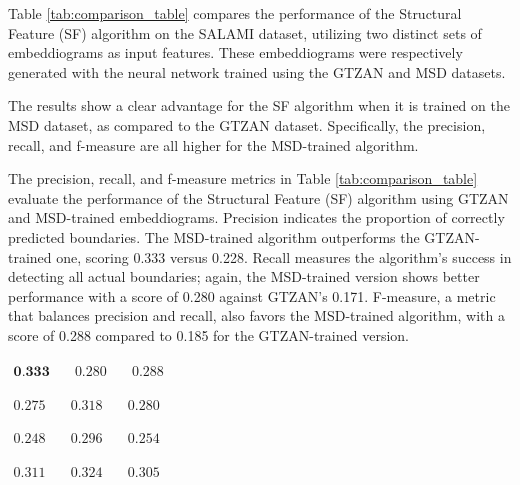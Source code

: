 
Table \ref{tab:comparison_table} compares the performance of the Structural Feature (SF) algorithm on the SALAMI dataset, utilizing two distinct sets of embeddiograms as input features. These embeddiograms were respectively generated with the neural network trained using the GTZAN and MSD datasets.

The results show a clear advantage for the SF algorithm when it is trained on the MSD dataset, as compared to the GTZAN dataset. Specifically, the precision, recall, and f-measure are all higher for the MSD-trained algorithm.

The precision, recall, and f-measure metrics in Table \ref{tab:comparison_table} evaluate the performance of the Structural Feature (SF) algorithm using GTZAN and MSD-trained embeddiograms. Precision indicates the proportion of correctly predicted boundaries. The MSD-trained algorithm outperforms the GTZAN-trained one, scoring 0.333 versus 0.228. Recall measures the algorithm's success in detecting all actual boundaries; again, the MSD-trained version shows better performance with a score of 0.280 against GTZAN's 0.171. F-measure, a metric that balances precision and recall, also favors the MSD-trained algorithm, with a score of 0.288 compared to 0.185 for the GTZAN-trained version.


\newsavebox\embeddiobSF
\begin{lrbox}{\embeddiobSF}
   $\begin{aligned}
     \textbf{0.333} & \quad 0.280 & \quad 0.288
    \end{aligned} $
\end{lrbox}

\newsavebox\embeddiobFoote
\begin{lrbox}{\embeddiobFoote}
   $\begin{aligned}
     0.275 & \quad 0.318 & \quad 0.280
    \end{aligned} $
\end{lrbox}

\newsavebox\embeddiobCNMF
\begin{lrbox}{\embeddiobCNMF}
   $\begin{aligned}
     0.248 & \quad 0.296 & \quad 0.254
    \end{aligned} $
\end{lrbox}

\newsavebox\pcpSF
\begin{lrbox}{\pcpSF}
   $\begin{aligned}
     0.311 & \quad 0.324 & \quad 0.305
    \end{aligned} $
\end{lrbox}

